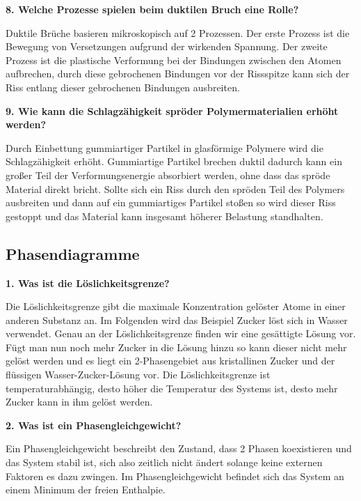 \noindent\textbf{8. Welche Prozesse spielen beim duktilen Bruch eine Rolle?}\\
\begin{addmargin}[25pt]{0pt}
Duktile Brüche basieren mikroskopisch auf 2 Prozessen. Der erste Prozess ist die Bewegung von Versetzungen aufgrund der wirkenden Spannung. Der zweite Prozess ist die plastische Verformung bei der Bindungen zwischen den Atomen aufbrechen, durch diese gebrochenen Bindungen vor der Rissspitze kann sich der Riss entlang dieser gebrochenen Bindungen ausbreiten.\\
\end{addmargin}

\noindent\textbf{9. Wie kann die Schlagzähigkeit spröder Polymermaterialien erhöht werden?}\\
\begin{addmargin}[25pt]{0pt}
Durch Einbettung gummiartiger Partikel in glasförmige Polymere wird die Schlagzähigkeit erhöht. Gummiartige Partikel brechen duktil dadurch kann ein großer Teil der Verformungsenergie absorbiert werden, ohne dass das spröde Material direkt bricht. Sollte sich ein Riss durch den spröden Teil des Polymers ausbreiten und dann auf ein gummiartiges Partikel stoßen so wird dieser Riss gestoppt und das Material kann insgesamt höherer Belastung standhalten. \\
\end{addmargin}

\subsection{Phasendiagramme}
\noindent\textbf{1. Was ist die Löslichkeitsgrenze?}\\
\begin{addmargin}[25pt]{0pt}
Die Löslichkeitsgrenze gibt die maximale Konzentration gelöster Atome in einer anderen Substanz an. Im Folgenden wird das Beispiel Zucker löst sich in Wasser verwendet. Genau an der Löslichkeitsgrenze finden wir eine gesättigte Lösung vor. Fügt man nun noch mehr Zucker in die Lösung hinzu so kann dieser nicht mehr gelöst werden und es liegt ein 2-Phasengebiet aus kristallinen Zucker und der flüssigen Wasser-Zucker-Lösung vor. Die Löslichkeitsgrenze ist temperaturabhängig, desto höher die Temperatur des Systems ist, desto mehr Zucker kann in ihm gelöst werden.  \\
\end{addmargin}


\noindent\textbf{2. Was ist ein Phasengleichgewicht?}\\
\begin{addmargin}[25pt]{0pt}
Ein Phasengleichgewicht beschreibt den Zustand, dass 2 Phasen koexistieren und das System stabil ist, sich also zeitlich nicht ändert solange keine externen Faktoren es dazu zwingen. Im Phasengleichgewicht befindet sich das System an einem Minimum der freien Enthalpie.\\
\end{addmargin}


